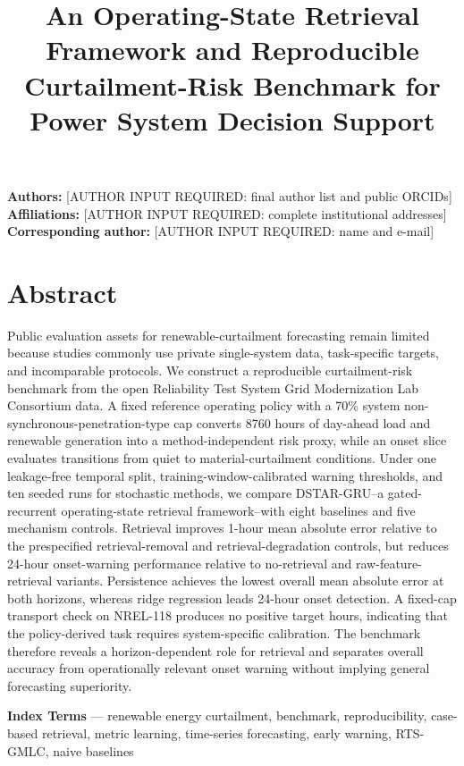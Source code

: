 \documentclass[
  10pt,
  a4paper,
]{article}
\title{An Operating-State Retrieval Framework and Reproducible
Curtailment-Risk Benchmark for Power System Decision Support}
\author{}
\date{}
\begin{document}
\maketitle

{
\hypersetup{linkcolor=}
\setcounter{tocdepth}{3}
\tableofcontents
}
\textbf{Authors:} {[}AUTHOR INPUT REQUIRED: final author list and public
ORCIDs{]} \textbf{Affiliations:} {[}AUTHOR INPUT REQUIRED: complete
institutional addresses{]} \textbf{Corresponding author:} {[}AUTHOR
INPUT REQUIRED: name and e-mail{]}

\section{Abstract}\label{abstract}

Public evaluation assets for renewable-curtailment forecasting remain
limited because studies commonly use private single-system data,
task-specific targets, and incomparable protocols. We construct a
reproducible curtailment-risk benchmark from the open Reliability Test
System Grid Modernization Lab Consortium data. A fixed reference
operating policy with a 70\% system non-synchronous-penetration-type cap
converts 8760 hours of day-ahead load and renewable generation into a
method-independent risk proxy, while an onset slice evaluates
transitions from quiet to material-curtailment conditions. Under one
leakage-free temporal split, training-window-calibrated warning
thresholds, and ten seeded runs for stochastic methods, we compare
DSTAR-GRU--a gated-recurrent operating-state retrieval framework--with
eight baselines and five mechanism controls. Retrieval improves 1-hour
mean absolute error relative to the prespecified retrieval-removal and
retrieval-degradation controls, but reduces 24-hour onset-warning
performance relative to no-retrieval and raw-feature-retrieval variants.
Persistence achieves the lowest overall mean absolute error at both
horizons, whereas ridge regression leads 24-hour onset detection. A
fixed-cap transport check on NREL-118 produces no positive target hours,
indicating that the policy-derived task requires system-specific
calibration. The benchmark therefore reveals a horizon-dependent role
for retrieval and separates overall accuracy from operationally relevant
onset warning without implying general forecasting superiority.

\textbf{Index Terms} --- renewable energy curtailment, benchmark,
reproducibility, case-based retrieval, metric learning, time-series
forecasting, early warning, RTS-GMLC, naive baselines
\end{document}
